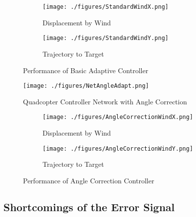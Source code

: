 \documentclass[letterpaper,12pt,titlepage,oneside,final]{book}
\begin{document}
\begin{figure}
\centering
\begin{subfigure}[t]{0.4\textwidth}
\texttt{[image: ./figures/StandardWindX.png]} %
\caption{Displacement by Wind}
\end{subfigure}
\begin{subfigure}[t]{0.4\textwidth}
\texttt{[image: ./figures/StandardWindY.png]}
\caption{Trajectory to Target}
\end{subfigure}
\caption{Performance of Basic Adaptive Controller}
\label{fig:PlotStandard}
\end{figure}

\begin{figure}
\centering
\texttt{[image: ./figures/NetAngleAdapt.png]} %
\caption{Quadcopter Controller Network with Angle Correction}
\label{fig:NetAngleAdapt}
\end{figure}

\begin{figure}
\centering
\begin{subfigure}[t]{0.4\textwidth}
\texttt{[image: ./figures/AngleCorrectionWindX.png]} %
\caption{Displacement by Wind}
\label{fig:PlotAngleAdaptA}
\end{subfigure}
\begin{subfigure}[t]{0.4\textwidth}
\texttt{[image: ./figures/AngleCorrectionWindY.png]}
\caption{Trajectory to Target}
\label{fig:PlotAngleAdaptB}
\end{subfigure}
\caption{Performance of Angle Correction Controller}
\label{fig:PlotAngleAdapt}
\end{figure}

\subsection{Shortcomings of the Error Signal}
\end{document}
